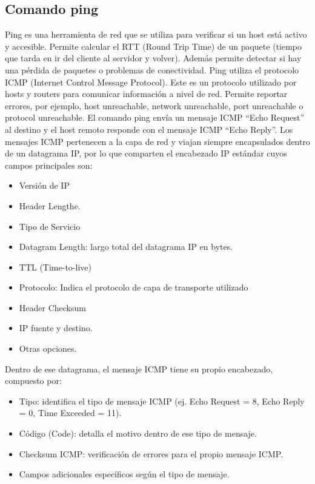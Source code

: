 \documentclass[12pt]{article} %
\begin{document}
\subsection{Comando ping} %
Ping es una herramienta de red que se utiliza para verificar si un host está activo y accesible. Permite calcular el RTT (Round Trip Time) de un paquete (tiempo que tarda en ir del cliente al servidor y volver). Además permite detectar si hay una pérdida de paquetes o problemas de conectividad.
\newline
\newline
Ping utiliza el protocolo ICMP (Internet Control Message Protocol). Este es un protocolo utilizado por hosts y routers para comunicar información a nivel de red. Permite reportar errores, por ejemplo, host unreachable, network unreachable, port unreachable o protocol unreachable. 
\newline
\newline
El comando ping envía un mensaje ICMP “Echo Request” al destino y el host remoto responde con el mensaje ICMP “Echo Reply”. Los mensajes ICMP pertenecen a la capa de red y viajan siempre encapsulados dentro de un datagrama IP, por lo que comparten el encabezado IP estándar cuyos campos principales son:
\begin{itemize}
    \item Versión de IP
    \item Header Lengthe.
    \item Tipo de Servicio
    \item Datagram Length: largo total del datagrama IP en bytes.
    \item TTL (Time-to-live)
    \item Protocolo: Indica el protocolo de capa de transporte utilizado
    \item Header Checksum
    \item IP fuente y destino.
    \item Otras opciones.
\end{itemize}
Dentro de ese datagrama, el mensaje ICMP tiene su propio encabezado, compuesto por:
\begin{itemize}
    \item Tipo: identifica el tipo de mensaje ICMP (ej. Echo Request = 8, Echo Reply = 0, Time Exceeded = 11).
    \item Código (Code): detalla el motivo dentro de ese tipo de mensaje.
    \item Checksum ICMP: verificación de errores para el propio mensaje ICMP.
    \item Campos adicionales específicos según el tipo de mensaje.
\end{itemize}
\end{document}
